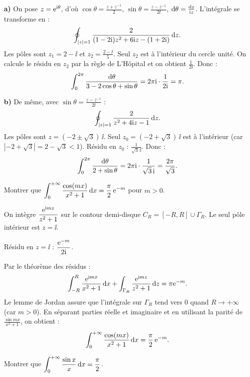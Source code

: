 \documentclass[12pt,a4paper]{article}
\begin{document}
\begin{boitecorrige}
\textbf{a)} On pose $z = \mathrm{e}^{\mathrm{i}\theta}$, d'où $\cos\theta = \tfrac{z+z^{-1}}{2}$, $\sin\theta = \tfrac{z-z^{-1}}{2\ii}$, $\mathrm{d}\theta = \tfrac{\mathrm{d} z}{\mathrm{i} z}$. L'intégrale se transforme en :
\[
\oint_{|z|=1}\frac{2}{(1-2\mathrm{i})z^2+6\mathrm{i} z-(1+2\mathrm{i})}\,\mathrm{d} z.
\]
Les pôles sont $z_1 = 2-\ii$ et $z_2 = \tfrac{2-\ii}{5}$. Seul $z_2$ est à l'intérieur du cercle unité. On calcule le résidu en $z_2$ par la règle de L'Hôpital et on obtient $\tfrac{1}{2\ii}$. Donc :
\[
\int_0^{2\pi}\frac{\mathrm{d}\theta}{3-2\cos\theta+\sin\theta} = 2\pi\mathrm{i}\cdot\frac{1}{2\mathrm{i}} = \pi.
\]

\textbf{b)} De même, avec $\sin\theta = \tfrac{z-z^{-1}}{2\ii}$ :
\[
\oint_{|z|=1}\frac{2}{z^2+4\mathrm{i} z-1}\,\mathrm{d} z.
\]
Les pôles sont $z = (-2\pm\sqrt{3})\,\ii$. Seul $z_0 = (-2+\sqrt{3})\,\ii$ est à l'intérieur (car $|{-2+\sqrt{3}}| = 2-\sqrt{3} < 1$). Résidu en $z_0$ : $\tfrac{1}{\sqrt{3}\,\ii}$. Donc :
\[
\int_0^{2\pi}\frac{\mathrm{d}\theta}{2+\sin\theta} = 2\pi\mathrm{i}\cdot\frac{1}{\sqrt{3}\,\mathrm{i}} = \frac{2\pi}{\sqrt{3}}.
\]
\end{boitecorrige}

\begin{boiteexercice}
\niveau{\difficile}
Montrer que $\displaystyle\int_0^{+\infty}\frac{\cos(mx)}{x^2+1}\,\mathrm{d} x = \frac{\pi}{2}\,\mathrm{e}^{-m}$ pour $m > 0$.
\end{boiteexercice}

\begin{boitecorrige}
On intègre $\dfrac{\mathrm{e}^{\mathrm{i} mz}}{z^2+1}$ sur le contour demi-disque $C_R = [-R,R]\cup\Gamma_R$. Le seul pôle intérieur est $z=\ii$.

Résidu en $z=\ii$ : $\dfrac{\mathrm{e}^{-m}}{2\mathrm{i}}$.

Par le théorème des résidus :
\[
\int_{-R}^R\frac{\mathrm{e}^{\mathrm{i} mx}}{x^2+1}\,\mathrm{d} x + \int_{\Gamma_R}\frac{\mathrm{e}^{\mathrm{i} mz}}{z^2+1}\,\mathrm{d} z = \pi\mathrm{e}^{-m}.
\]
Le lemme de Jordan assure que l'intégrale sur $\Gamma_R$ tend vers $0$ quand $R\to+\infty$ (car $m>0$). En séparant parties réelle et imaginaire et en utilisant la parité de $\tfrac{\sin mx}{x^2+1}$, on obtient :
\[
\int_0^{+\infty}\frac{\cos(mx)}{x^2+1}\,\mathrm{d} x = \frac{\pi}{2}\,\mathrm{e}^{-m}.
\]
\end{boitecorrige}

\begin{boiteexercice}
\niveau{\difficile}
Montrer que $\displaystyle\int_0^{+\infty}\frac{\sin x}{x}\,\mathrm{d} x = \frac{\pi}{2}$.
\end{boiteexercice}
\end{document}
